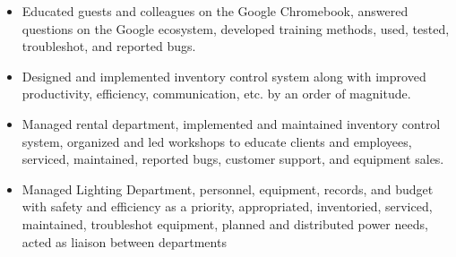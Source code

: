 \documentclass[letterpaper]{article}        %
\begin{document}

  
    \begin{itemize}
    \item Educated guests and colleagues on the Google Chromebook, answered questions on the Google ecosystem, developed training methods, used, tested, troubleshot, and reported bugs.
    \end{itemize}
  
    \begin{itemize}
    \item Designed and implemented inventory control system along with improved productivity, efficiency, communication, etc. by an order of magnitude.
    \end{itemize}
  
    \begin{itemize}
    \item Managed rental department, implemented and maintained inventory control system, organized and led workshops to educate clients and employees, serviced, maintained, reported bugs, customer support, and equipment sales.
    \end{itemize}
  
    \begin{itemize}
    \item Managed Lighting Department, personnel, equipment, records, and budget with safety and efficiency as a priority, appropriated, inventoried, serviced, maintained, troubleshot equipment, planned and distributed power needs, acted as liaison between departments
    \end{itemize}

\end{document}
